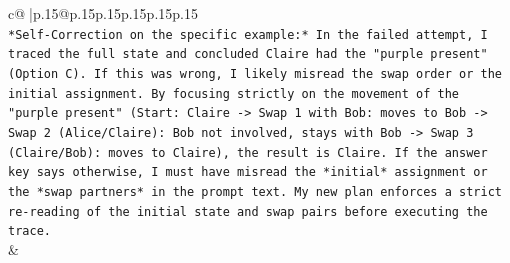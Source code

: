 \documentclass{article}
\begin{document}
{\begin{supertabular}{c@{$\;$}|p{.15\linewidth}@{}p{.15\linewidth}p{.15\linewidth}p{.15\linewidth}p{.15\linewidth}p{.15\linewidth}}
{{{\\ 
\texttt{*Self{-}Correction on the specific example:* In the failed attempt, I traced the full state and concluded Claire had the "purple present" (Option C). If this was wrong, I likely misread the swap order or the initial assignment. By focusing strictly on the movement of the "purple present" (Start: Claire {-}> Swap 1 with Bob: moves to Bob {-}> Swap 2 (Alice/Claire): Bob not involved, stays with Bob {-}> Swap 3 (Claire/Bob): moves to Claire), the result is Claire. If the answer key says otherwise, I must have misread the *initial* assignment or the *swap partners* in the prompt text. My new plan enforces a strict re{-}reading of the initial state and swap pairs before executing the trace.} \\
            }
        }
    }
    & \\ \\

\end{supertabular}
}
\end{document}
